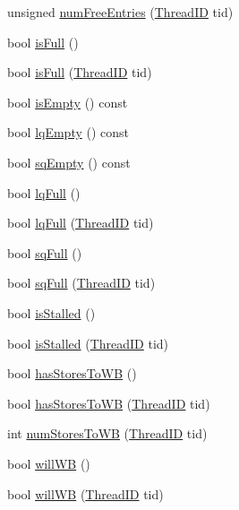 \begin{DoxyCompactItemize}
\item 
unsigned \hyperlink{classLSQ_acc878f608deead5b5319a6a3f98b50c8}{numFreeEntries} (\hyperlink{base_2types_8hh_ab39b1a4f9dad884694c7a74ed69e6a6b}{ThreadID} tid)
\item 
bool \hyperlink{classLSQ_a3e70330939fdfc4dbc2f60c1a660584d}{isFull} ()
\item 
bool \hyperlink{classLSQ_a30fac732df9b3fda011c7329a112cb31}{isFull} (\hyperlink{base_2types_8hh_ab39b1a4f9dad884694c7a74ed69e6a6b}{ThreadID} tid)
\item 
bool \hyperlink{classLSQ_a479432127ee77145cc19d6a2d1590821}{isEmpty} () const 
\item 
bool \hyperlink{classLSQ_a01d2807c1345befcffd168a2a9dbdbf2}{lqEmpty} () const 
\item 
bool \hyperlink{classLSQ_a5761e9640bec8ba8474945cce57b6501}{sqEmpty} () const 
\item 
bool \hyperlink{classLSQ_a5893daf623130be826f492bbff58f757}{lqFull} ()
\item 
bool \hyperlink{classLSQ_afa1d531e5f388b1cdc3af03100f63061}{lqFull} (\hyperlink{base_2types_8hh_ab39b1a4f9dad884694c7a74ed69e6a6b}{ThreadID} tid)
\item 
bool \hyperlink{classLSQ_a477981d1f905d2d398a1527f7149e3c4}{sqFull} ()
\item 
bool \hyperlink{classLSQ_a6a3501ebb06c38938a3b0ebcea2b6a8b}{sqFull} (\hyperlink{base_2types_8hh_ab39b1a4f9dad884694c7a74ed69e6a6b}{ThreadID} tid)
\item 
bool \hyperlink{classLSQ_af8eb8590fbfa6ecd2f796390677a4c00}{isStalled} ()
\item 
bool \hyperlink{classLSQ_a5532c6a5a314b05c9d29a319aa3a76a6}{isStalled} (\hyperlink{base_2types_8hh_ab39b1a4f9dad884694c7a74ed69e6a6b}{ThreadID} tid)
\item 
bool \hyperlink{classLSQ_ad2e4b46255cfb53e85522adeed4e2089}{hasStoresToWB} ()
\item 
bool \hyperlink{classLSQ_a7e6f40e5ef3dbfe9d3d8da2dbeaf2b91}{hasStoresToWB} (\hyperlink{base_2types_8hh_ab39b1a4f9dad884694c7a74ed69e6a6b}{ThreadID} tid)
\item 
int \hyperlink{classLSQ_a4115edd209f7e5e51c3a17d40edd9e7a}{numStoresToWB} (\hyperlink{base_2types_8hh_ab39b1a4f9dad884694c7a74ed69e6a6b}{ThreadID} tid)
\item 
bool \hyperlink{classLSQ_a338be821734603396bfef8d9fb8f04b0}{willWB} ()
\item 
bool \hyperlink{classLSQ_a71ae97788e6b1230662807e1b03f47b3}{willWB} (\hyperlink{base_2types_8hh_ab39b1a4f9dad884694c7a74ed69e6a6b}{ThreadID} tid)

\end{DoxyCompactItemize}
